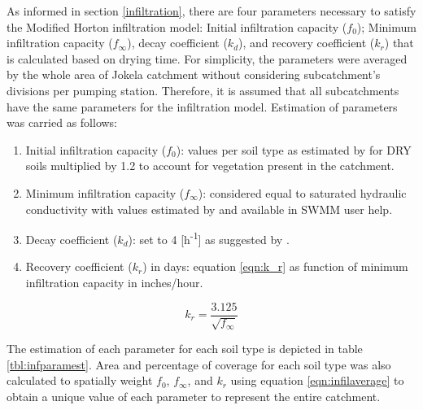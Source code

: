 As informed in section \ref{infiltration}, there are four parameters necessary to satisfy the Modified Horton infiltration model: Initial infiltration capacity ($f_0$); Minimum infiltration capacity ($f_\infty$), decay coefficient ($k_d$), and recovery coefficient ($k_r$) that is calculated based on drying time. For simplicity, the parameters were averaged by the whole area of Jokela catchment without considering subcatchment's divisions per pumping station. Therefore, it is assumed that all subcatchments have the same parameters for the infiltration model. Estimation of parameters was carried as follows:
\begin{enumerate}
    \item Initial infiltration capacity ($f_0$): values per soil type as estimated by \citet{Rossman2016} for DRY soils multiplied by 1.2 to account for vegetation present in the catchment.
    \item Minimum infiltration capacity ($f_\infty$): considered equal to saturated hydraulic conductivity with values estimated by \citet{Rawls1983} and available in SWMM user help.
    \item Decay coefficient ($k_d$): set to 4 [h\textsuperscript{-1}] as suggested by \citet{Rossman2016}.
    \item Recovery coefficient ($k_r$) in days: equation \ref{eqn:k_r} as function of minimum infiltration capacity in inches/hour.
\end{enumerate}

\begin{equation}
\label{eqn:k_r}
k_r = \frac{3.125}{\sqrt{f_\infty}}
\end{equation}


The estimation of each parameter for each soil type is depicted in table \ref{tbl:infparamest}. Area and percentage of coverage for each soil type was also calculated to spatially weight $f_0$, $f_\infty$, and $k_r$ using equation \ref{eqn:infilaverage} to obtain a unique value of each parameter to represent the entire catchment.


